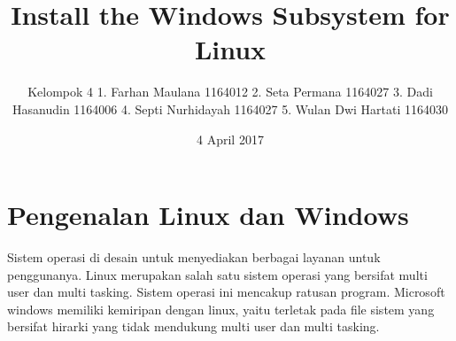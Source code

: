 \documentclass{Install the Windows Subsystem for Linux}
\title{Install the Windows Subsystem for Linux \LaTex}
\author{Kelompok 4
1. Farhan Maulana       1164012
2. Seta Permana         1164027
3. Dadi Hasanudin       1164006
4. Septi Nurhidayah     1164027
5. Wulan Dwi Hartati    1164030}
\date{4 April 2017}
\begin{document}
\maketitle
\section{Pengenalan Linux dan Windows}
Sistem operasi di desain untuk menyediakan berbagai layanan untuk penggunanya. Linux merupakan salah satu sistem operasi yang bersifat multi user dan multi tasking. Sistem operasi ini mencakup ratusan program. Microsoft windows memiliki kemiripan dengan linux, yaitu terletak pada file sistem yang bersifat hirarki yang tidak mendukung multi user dan multi tasking.
\end{document}
